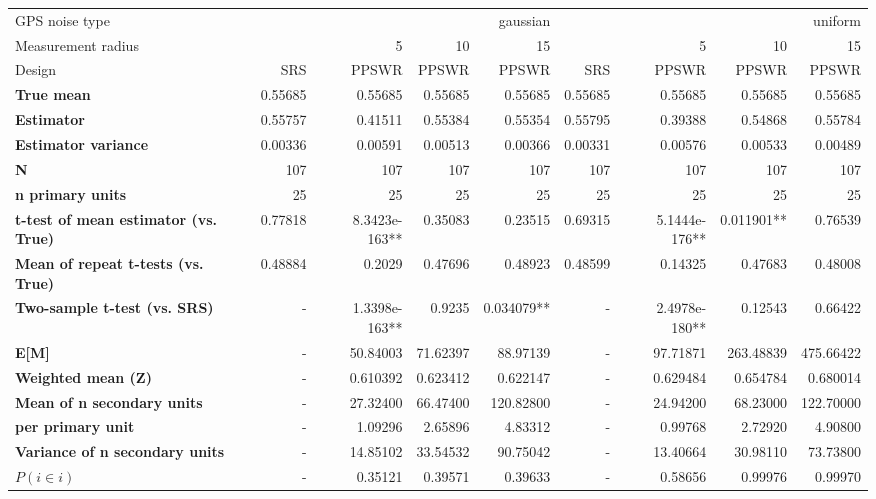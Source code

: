 \begin{tabular}{l|r|rrr|r|rrr}
\toprule
GPS noise type & \multicolumn{4}{r}{gaussian} & \multicolumn{4}{r}{uniform} \\
Measurement radius &  & 5 & 10 & 15 &  & 5 & 10 & 15 \\
Design & SRS & PPSWR & PPSWR & PPSWR & SRS & PPSWR & PPSWR & PPSWR \\
\midrule
\textbf{True mean} &  0.55685 &  0.55685 &  0.55685 &  0.55685 &  0.55685 &  0.55685 &  0.55685 &  0.55685 \\
\textbf{Estimator} & 0.55757 & 0.41511 & 0.55384 & 0.55354 & 0.55795 & 0.39388 & 0.54868 & 0.55784 \\
\textbf{Estimator variance} & 0.00336 & 0.00591 & 0.00513 & 0.00366 & 0.00331 & 0.00576 & 0.00533 & 0.00489 \\
\textbf{N} & 107 & 107 & 107 & 107 & 107 & 107 & 107 & 107 \\
\textbf{n primary units} & 25 & 25 & 25 & 25 & 25 & 25 & 25 & 25 \\
\textbf{t-test of mean estimator (vs. True)} & 0.77818 & 8.3423e-163** & 0.35083 & 0.23515 & 0.69315 & 5.1444e-176** & 0.011901** & 0.76539 \\
\textbf{Mean of repeat t-tests (vs. True)} & 0.48884 & 0.2029 & 0.47696 & 0.48923 & 0.48599 & 0.14325 & 0.47683 & 0.48008 \\
\textbf{Two-sample t-test (vs. SRS)} & - & 1.3398e-163** & 0.9235 & 0.034079** & - & 2.4978e-180** & 0.12543 & 0.66422 \\
\textbf{E[M]} & - & 50.84003 & 71.62397 & 88.97139 & - & 97.71871 & 263.48839 & 475.66422 \\
\textbf{Weighted mean (Z)} & - & 0.610392 & 0.623412 & 0.622147 & - & 0.629484 & 0.654784 & 0.680014 \\
\textbf{Mean of n secondary units} & - & 27.32400 & 66.47400 & 120.82800 & - & 24.94200 & 68.23000 & 122.70000 \\
\textbf{     per primary unit} & - & 1.09296 & 2.65896 & 4.83312 & - & 0.99768 & 2.72920 & 4.90800 \\
\textbf{Variance of n secondary units} & - & 14.85102 & 33.54532 & 90.75042 & - & 13.40664 & 30.98110 & 73.73800 \\
\textbf{$P(i \in i)$} & - & 0.35121 & 0.39571 & 0.39633 & - & 0.58656 & 0.99976 & 0.99970 \\
\bottomrule
\end{tabular}
